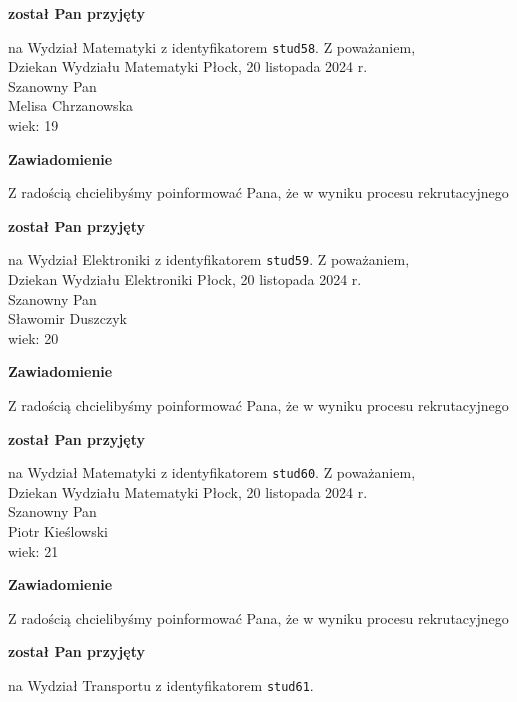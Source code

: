 \documentclass[12pt,a4paper]{article}
\begin{document}
\begin{center}
\textsf{\textbf{został Pan przyjęty}} 
\end{center}
na Wydział Matematyki z identyfikatorem \verb|stud58|. 
\vspace{2cm}
\noindent
Z poważaniem,\\
Dziekan
Wydziału Matematyki
\newpage
\hfill Płock, 20 listopada 2024 r.\\
\noindent 
Szanowny Pan \\
Melisa Chrzanowska \\
wiek: 19
\bigskip
\begin{center}
 	{\Large\textbf{Zawiadomienie}}
\end{center}
\bigskip
Z radością chcielibyśmy poinformować Pana, że w wyniku procesu rekrutacyjnego 
\begin{center}
\textsf{\textbf{został Pan przyjęty}} 
\end{center}
na Wydział Elektroniki z identyfikatorem \verb|stud59|. 
\vspace{2cm}
\noindent
Z poważaniem,\\
Dziekan
Wydziału Elektroniki
\newpage
\hfill Płock, 20 listopada 2024 r.\\
\noindent 
Szanowny Pan \\
Sławomir Duszczyk \\
wiek: 20
\bigskip
\begin{center}
 	{\Large\textbf{Zawiadomienie}}
\end{center}
\bigskip
Z radością chcielibyśmy poinformować Pana, że w wyniku procesu rekrutacyjnego 
\begin{center}
\textsf{\textbf{został Pan przyjęty}} 
\end{center}
na Wydział Matematyki z identyfikatorem \verb|stud60|. 
\vspace{2cm}
\noindent
Z poważaniem,\\
Dziekan
Wydziału Matematyki
\newpage
\hfill Płock, 20 listopada 2024 r.\\
\noindent 
Szanowny Pan \\
Piotr Kieślowski \\
wiek: 21
\bigskip
\begin{center}
 	{\Large\textbf{Zawiadomienie}}
\end{center}
\bigskip
Z radością chcielibyśmy poinformować Pana, że w wyniku procesu rekrutacyjnego 
\begin{center}
\textsf{\textbf{został Pan przyjęty}} 
\end{center}
na Wydział Transportu z identyfikatorem \verb|stud61|. 
\end{document}
